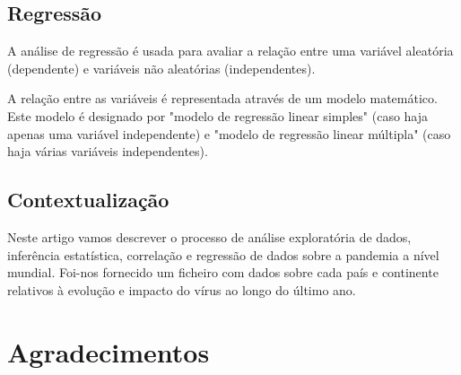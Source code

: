 \documentclass[conference]{IEEEtran}
\begin{document}
\subsection{Regressão}

A análise de regressão é usada para avaliar a relação entre uma variável aleatória (dependente) e variáveis não aleatórias (independentes).

A relação entre as variáveis é representada através de um modelo matemático. Este modelo é designado por "modelo de regressão linear simples" (caso haja apenas uma variável independente) e "modelo de regressão linear múltipla" (caso haja várias variáveis independentes).

\subsection{Contextualização}

Neste artigo vamos descrever o processo de análise exploratória de dados, inferência estatística, correlação e regressão de dados sobre a pandemia a nível mundial. Foi-nos fornecido um ficheiro com dados sobre cada país e continente relativos à evolução e impacto do vírus ao longo do último ano.

\section*{Agradecimentos}


\printbibliography
\end{document}
